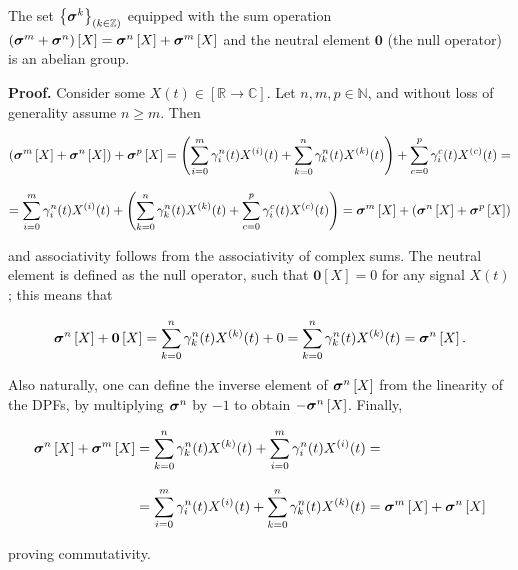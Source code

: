 \begin{theorem}\label{theo:abelian} %
	The set $\left\{\boldsymbol{\sigma}^{k}\right\}_{(k\in\mathbb{Z})}$ equipped with the sum operation $\left(\boldsymbol{\sigma}^{m} + \boldsymbol{\sigma}^{n}\right)\left[X\right] = \boldsymbol{\sigma}^{n}\left[X\right] + \boldsymbol{\sigma}^{m}\left[X\right]$ and the neutral element $\mathbf{0}$ (the null operator) is an abelian group. \end{theorem}
\textbf{Proof.} Consider some $X(t)\in\left[\mathbb{R}\to\mathbb{C}\right]$. Let $n,m,p\in\mathbb{N}$, and without loss of generality assume $n\geq m$. Then

\begin{gather}
	\left(\boldsymbol{\sigma}^{m}\left[X\right] + \boldsymbol{\sigma}^{n}\left[X\right] \right) + \boldsymbol{\sigma}^{p}\left[X\right] = \left(\sum_{i=0}^m \gamma_i^n (t) X^{(i)}(t) + \sum_{k=0}^n \gamma_k^n (t) X^{(k)}(t)\right) + \sum_{c=0}^p \gamma_i^c (t) X^{(c)}(t) = \nonumber\\[3mm]
	= \sum_{i=0}^m \gamma_i^n (t) X^{(i)}(t) + \left( \sum_{k=0}^n \gamma_k^n (t) X^{(k)}(t) + \sum_{c=0}^p \gamma_i^c (t) X^{(c)}(t)\right) = \boldsymbol{\sigma}^{m}\left[X\right] + \left(\boldsymbol{\sigma}^{n}\left[X\right] + \boldsymbol{\sigma}^{p}\left[X\right]\right)
\end{gather}

	\noindent and associativity follows from the associativity of complex sums. The neutral element is defined as the null operator, such that $\mathbf{0}\left[X\right] = 0$ for any signal $X(t)$; this means that

\begin{equation} \boldsymbol{\sigma}^{n}\left[X\right] + \mathbf{0}\left[X\right] = \sum_{k=0}^n \gamma_k^n (t) X^{(k)}(t) + 0 = \sum_{k=0}^n \gamma_k^n (t) X^{(k)}(t) = \boldsymbol{\sigma}^{n}\left[X\right] .\end{equation}

	Also naturally, one can define the inverse element of $\boldsymbol{\sigma}^{n}\left[X\right]$ from the linearity of the DPFs, by multiplying $\boldsymbol{\sigma}^{n}$ by $-1$ to obtain $-\boldsymbol{\sigma}^{n}\left[X\right]$. Finally, 

\begin{align} \boldsymbol{\sigma}^{n}\left[X\right] + \boldsymbol{\sigma}^{m}\left[X\right] &= \sum_{k=0}^n \gamma_k^n (t) X^{(k)}(t) + \sum_{i=0}^m \gamma_i^n (t) X^{(i)}(t) = \nonumber\\[3mm] &= \sum_{i=0}^m \gamma_i^n (t) X^{(i)}(t) + \sum_{k=0}^n \gamma_k^n (t) X^{(k)}(t) = \boldsymbol{\sigma}^{m}\left[X\right] + \boldsymbol{\sigma}^{n}\left[X\right]\end{align}

	\noindent proving commutativity.

